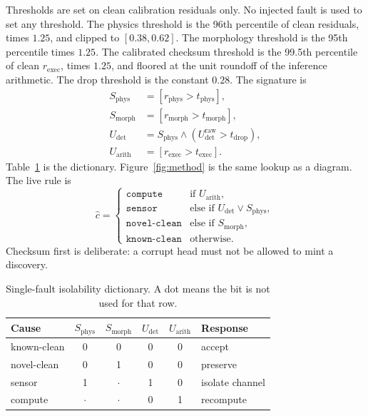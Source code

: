 \documentclass{ieeeaccess}
\begin{document}
Thresholds are set on clean calibration residuals only. No injected fault is used to set any threshold. The physics threshold is the 96th percentile of clean residuals, times $1.25$, and clipped to $[0.38,0.62]$. The morphology threshold is the 95th percentile times $1.25$. The calibrated checksum threshold is the 99.5th percentile of clean $r_{\mathrm{exec}}$, times $1.25$, and floored at the unit roundoff of the inference arithmetic. The drop threshold is the constant $0.28$. The signature is
\begin{align*}
S_{\mathrm{phys}} &= [r_{\mathrm{phys}}>t_{\mathrm{phys}}],\\
S_{\mathrm{morph}} &= [r_{\mathrm{morph}}>t_{\mathrm{morph}}],\\
U_{\mathrm{det}} &= S_{\mathrm{phys}}\wedge(U_{\mathrm{det}}^{\mathrm{raw}}>t_{\mathrm{drop}}),\\
U_{\mathrm{arith}} &= [r_{\mathrm{exec}}>t_{\mathrm{exec}}].
\end{align*}
Table~\ref{tab:dict} is the dictionary. Figure~\ref{fig:method} is the same lookup as a diagram. The live rule is
\begin{equation}
\hat{c}=\begin{cases}
\texttt{compute} & \text{if }U_{\mathrm{arith}},\\
\texttt{sensor} & \text{else if }U_{\mathrm{det}}\vee S_{\mathrm{phys}},\\
\texttt{novel-clean} & \text{else if }S_{\mathrm{morph}},\\
\texttt{known-clean} & \text{otherwise.}
\end{cases}
\label{eq:lookup}
\end{equation}
Checksum first is deliberate: a corrupt head must not be allowed to mint a discovery.

\begin{table}[t]
\caption{Single-fault isolability dictionary. A dot means the bit is not used for that row.}
\label{tab:dict}
\centering
\begin{tabular}{lccccl}
\toprule
Cause & $S_{\mathrm{phys}}$ & $S_{\mathrm{morph}}$ & $U_{\mathrm{det}}$ & $U_{\mathrm{arith}}$ & Response \\
\midrule
known-clean & 0 & 0 & 0 & 0 & accept \\
novel-clean & 0 & 1 & 0 & 0 & preserve \\
sensor & 1 & $\cdot$ & 1 & 0 & isolate channel \\
compute & $\cdot$ & $\cdot$ & 0 & 1 & recompute \\
\bottomrule
\end{tabular}
\end{table}
\end{document}
